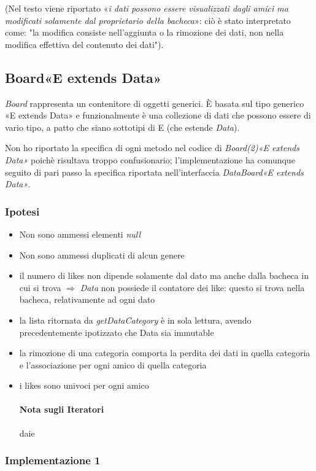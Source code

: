 \documentclass[10pt, a4paper]{article}
\begin{document}
\begin{footnotesize}
(Nel testo viene riportato «\textit{i dati possono essere
visualizzati dagli amici ma modificati solamente dal proprietario della bacheca}»: ciò è stato interpretato come: "la modifica consiste nell'aggiunta o la rimozione dei dati, non nella  modifica effettiva del contenuto dei dati").
\end{footnotesize}
\bigskip
\subsection{Board«E extends Data» }

\textit{Board} rappresenta un contenitore di oggetti generici. È basata sul tipo generico «E extends Data» e funzionalmente è una collezione di dati che possono essere di vario tipo, a patto che siano sottotipi di E (che estende \textit{Data}).

Non ho riportato la specifica di ogni metodo nel codice di \textit{Board(2)«E extends Data»} poichè risultava troppo confusionario; l'implementazione ha comunque seguito di pari passo la specifica riportata nell'interfaccia \textit{DataBoard«E extends Data»}.
\subsubsection{Ipotesi}
\begin{itemize}
\item Non sono ammessi elementi \textit{null}
\item Non sono ammessi duplicati di alcun genere
\item il numero di likes non dipende solamente dal dato ma anche dalla bacheca in cui si trova $\Rightarrow$ \textit{Data} non possiede il contatore dei like: questo si trova nella bacheca, relativamente ad ogni dato
\item la lista ritornata da \textit{getDataCategory} è in sola lettura, avendo precedentemente ipotizzato che Data sia immutable
\item la rimozione di una categoria comporta la perdita dei dati in quella categoria e l'associazione per ogni amico di quella categoria
\item i likes sono univoci per ogni amico
\paragraph{Nota sugli Iteratori} daie
\end{itemize}

\subsubsection{Implementazione 1}
\end{document}
